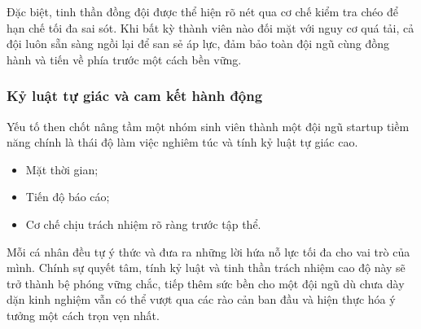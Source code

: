 Đặc biệt, tinh thần đồng đội được thể hiện rõ nét qua cơ chế kiểm tra chéo để hạn chế tối đa sai sót. Khi bất kỳ thành viên nào đối mặt với nguy cơ quá tải, cả đội luôn sẵn sàng ngồi lại để san sẻ áp lực, đảm bảo toàn đội ngũ cùng đồng hành và tiến về phía trước một cách bền vững.
 
\subsubsection{Kỷ luật tự giác và cam kết hành động}
 
Yếu tố then chốt nâng tầm một nhóm sinh viên thành một đội ngũ startup tiềm năng chính là thái độ làm việc nghiêm túc và tính kỷ luật tự giác cao.
 
\begin{itemize}
    \item Mặt thời gian;
    \item Tiến độ báo cáo;
    \item Cơ chế chịu trách nhiệm rõ ràng trước tập thể.
\end{itemize}
 
Mỗi cá nhân đều tự ý thức và đưa ra những lời hứa nỗ lực tối đa cho vai trò của mình. Chính sự quyết tâm, tính kỷ luật và tinh thần trách nhiệm cao độ này sẽ trở thành bệ phóng vững chắc, tiếp thêm sức bền cho một đội ngũ dù chưa dày dặn kinh nghiệm vẫn có thể vượt qua các rào cản ban đầu và hiện thực hóa ý tưởng một cách trọn vẹn nhất.